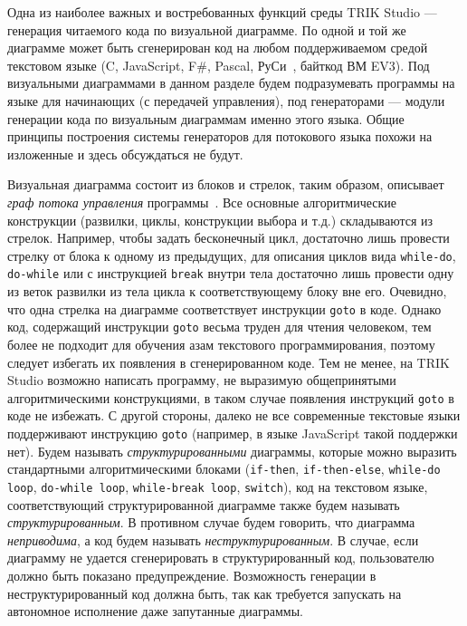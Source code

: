 \documentclass[a5paper]{article}
\begin{document}
Одна из наиболее важных и востребованных функций среды TRIK Studio --- генерация читаемого кода по визуальной диаграмме. По одной и той же диаграмме может быть сгенерирован код на любом поддерживаемом средой текстовом языке (C, JavaScript, F\#, Pascal, РуСи~\cite{тереховотечественные}, байткод ВМ EV3). Под визуальными диаграммами в данном разделе будем подразумевать программы на языке для начинающих (с передачей управления), под генераторами --- модули генерации кода по визуальным диаграммам именно этого языка. Общие принципы построения системы генераторов для потокового языка похожи на изложенные и здесь обсуждаться не будут.

Визуальная диаграмма состоит из блоков и стрелок, таким образом, описывает \textit{граф потока управления} программы~\cite{steven1997advanced}. Все основные алгоритмические конструкции (развилки, циклы, конструкции выбора и т.д.) складываются из стрелок. Например, чтобы задать бесконечный цикл, достаточно лишь провести стрелку от блока к одному из предыдущих, для описания циклов вида \texttt{while-do}, \texttt{do-while} или с инструкцией \texttt{break} внутри тела достаточно лишь провести одну из веток развилки из тела цикла к соответствующему блоку вне его. Очевидно, что одна стрелка на диаграмме соответствует инструкции \texttt{goto} в коде. Однако код, содержащий инструкции \texttt{goto} весьма труден для чтения человеком, тем более не подходит для обучения азам текстового программирования, поэтому следует избегать их появления в сгенерированном коде. Тем не менее, на TRIK Studio возможно написать программу, не выразимую общепринятыми алгоритмическими конструкциями, в таком случае появления инструкций \texttt{goto} в коде не избежать. С другой стороны, далеко не все современные текстовые языки поддерживают инструкцию \texttt{goto} (например, в языке JavaScript такой поддержки нет). Будем называть \textit{структурированными} диаграммы, которые можно выразить стандартными алгоритмическими блоками (\texttt{if-then}, \texttt{if-then-else}, \texttt{while-do loop}, \texttt{do-while loop}, \texttt{while-break loop}, \texttt{switch}), код на текстовом языке, соответствующий структурированной диаграмме также будем называть \textit{структурированным}. В противном случае будем говорить, что диаграмма \textit{неприводима}, а код будем называть \textit{неструктурированным}. В случае, если диаграмму не удается сгенерировать в структурированный код, пользователю должно быть показано предупреждение. Возможность генерации в неструктурированный код должна быть, так как требуется запускать на автономное исполнение даже запутанные диаграммы.
\end{document}
